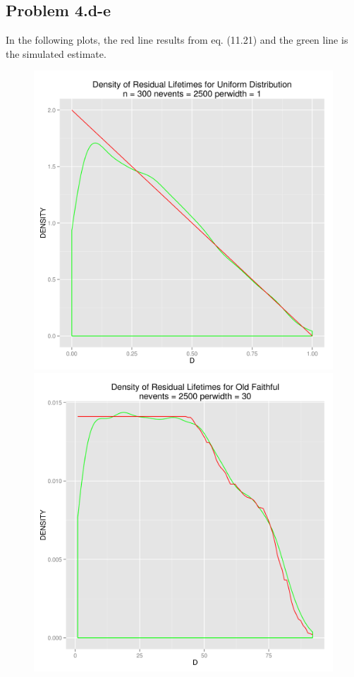 \documentclass[letter]{article}
\begin{document}
\subsection*{Problem 4.d-e}
In the following plots, the red line results from eq. (11.21) and the green line
is the simulated estimate. 
\begin{figure}[H]
\centering
  \includegraphics[scale=0.5]{figures/4d.png}
  \includegraphics[scale=0.5]{figures/4e.png}
\end{figure}
\end{document}
